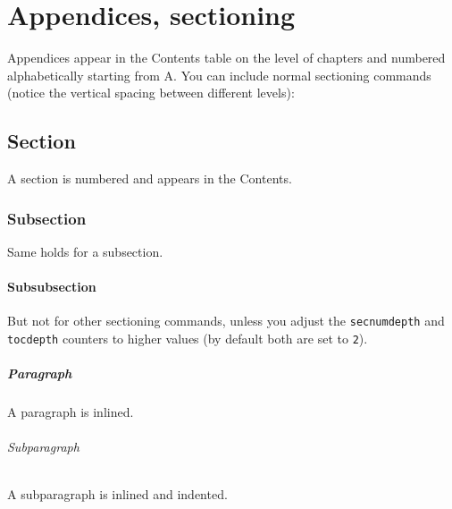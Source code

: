 
%
%

\chapter{Appendices, sectioning}\label{app:spacing}

Appendices appear in the Contents table on the level of chapters and
numbered alphabetically starting from A. You can include normal
sectioning commands (notice the vertical spacing between different
levels):

\section{Section}
A section is numbered and appears in the Contents.

\subsection{Subsection}
Same holds for a subsection.

\subsubsection{Subsubsection}
But not for other sectioning commands, unless you adjust the
\verb+secnumdepth+ and
\verb+tocdepth+
counters to higher values (by default both are set to \texttt{2}).

\paragraph{Paragraph}
A paragraph is inlined.

\subparagraph{Subparagraph}
A subparagraph is inlined and indented.




